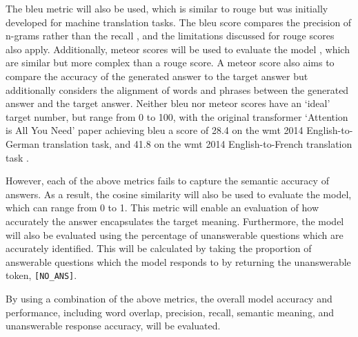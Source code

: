 The \acrshort{bleu} metric will also be used, which is similar to \acrshort{rouge} but was initially developed for machine translation tasks. The \acrshort{bleu} score compares the precision of n-grams rather than the recall \citep{papineniBleu}, and the limitations discussed for \acrshort{rouge} scores also apply. Additionally, \acrshort{meteor} scores will be used to evaluate the model \citep{banerjeeMeteor}, which are similar but more complex than a \acrshort{rouge} score. A \acrshort{meteor} score also aims to compare the accuracy of the generated answer to the target answer but additionally considers the alignment of words and phrases between the generated answer and the target answer. Neither \acrshort{bleu} nor \acrshort{meteor} scores have an `ideal' target number, but range from 0 to 100, with the original transformer `Attention is All You Need' paper achieving \acrshort{bleu} a score of 28.4 on the \acrshort{wmt} 2014 English-to-German translation task, and 41.8 on the \acrshort{wmt} 2014 English-to-French translation task \cite{vaswani2017attention}.

However, each of the above metrics fails to capture the semantic accuracy of answers. As a result, the cosine similarity will also be used to evaluate the model, which can range from 0 to 1. This metric will enable an evaluation of how accurately the answer encapsulates the target meaning. Furthermore, the model will also be evaluated using the percentage of unanswerable questions which are accurately identified. This will be calculated by taking the proportion of answerable questions which the model responds to by returning the unanswerable token, \texttt{[NO\_ANS]}.

By using a combination of the above metrics, the overall model accuracy and performance, including word overlap, precision, recall, semantic meaning, and unanswerable response accuracy, will be evaluated.
